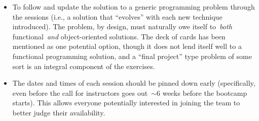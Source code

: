 \begin{itemize}
	\item To follow and update the solution to a generic programming problem
	through the sessions (i.e., a solution that ``evolves'' with each new
	technique introduced).
	The problem, by design, must naturally owe itself to~\textit{both}
	functional~\textit{and} object-oriented solutions.
	The deck of cards has been mentioned as one potential option, though it
	does not lend itself well to a functional programming solution, and a
	``final project'' type problem of some sort is an integral component of
	the exercises.

	\item The dates and times of each session should be pinned down early
	(specifically, even before the call for instructors goes out~$\sim$6 weeks
	before the bootcamp starts).
	This allows everyone potentially interested in joining the team to better
	judge their availability.

\end{itemize}
